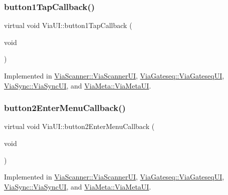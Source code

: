 \mbox{\label{class_via_u_i_a5bdacaef84e33fb3d9b3dd50d1b269d1}} 
\subsubsection{\texorpdfstring{button1\+Tap\+Callback()}{button1TapCallback()}}
{\footnotesize\ttfamily virtual void Via\+U\+I\+::button1\+Tap\+Callback (\begin{DoxyParamCaption}\item[{void}]{ }\end{DoxyParamCaption})\hspace{0.3cm}{\ttfamily [pure virtual]}}



Implemented in \mbox{\hyperlink{class_via_scanner_1_1_via_scanner_u_i_a0347e038aa4ac6c8e7e9f50272cc19d8}{Via\+Scanner\+::\+Via\+Scanner\+UI}}, \mbox{\hyperlink{class_via_gateseq_1_1_via_gateseq_u_i_ac5e0a6f47606f0f41860fd797a004b1f}{Via\+Gateseq\+::\+Via\+Gateseq\+UI}}, \mbox{\hyperlink{class_via_sync_1_1_via_sync_u_i_adbf5a730f6f3986d7f787c9ac1f41cb3}{Via\+Sync\+::\+Via\+Sync\+UI}}, and \mbox{\hyperlink{class_via_meta_1_1_via_meta_u_i_af36b9d43b3a7e014650825c81fcf5893}{Via\+Meta\+::\+Via\+Meta\+UI}}.

\mbox{\label{class_via_u_i_ac7b7f919edba9a640e7009e1f9303a2d}} 
\subsubsection{\texorpdfstring{button2\+Enter\+Menu\+Callback()}{button2EnterMenuCallback()}}
{\footnotesize\ttfamily virtual void Via\+U\+I\+::button2\+Enter\+Menu\+Callback (\begin{DoxyParamCaption}\item[{void}]{ }\end{DoxyParamCaption})\hspace{0.3cm}{\ttfamily [pure virtual]}}



Implemented in \mbox{\hyperlink{class_via_scanner_1_1_via_scanner_u_i_acb45c99dcac36f93d98621f6c53c9a0a}{Via\+Scanner\+::\+Via\+Scanner\+UI}}, \mbox{\hyperlink{class_via_gateseq_1_1_via_gateseq_u_i_ae0e3038febadb4cde08ff0f3da2703fe}{Via\+Gateseq\+::\+Via\+Gateseq\+UI}}, \mbox{\hyperlink{class_via_sync_1_1_via_sync_u_i_a92bc4b1308d5994bef5989a8e975321d}{Via\+Sync\+::\+Via\+Sync\+UI}}, and \mbox{\hyperlink{class_via_meta_1_1_via_meta_u_i_a5687d94232ddf1b109a5f48c8ef89650}{Via\+Meta\+::\+Via\+Meta\+UI}}.

